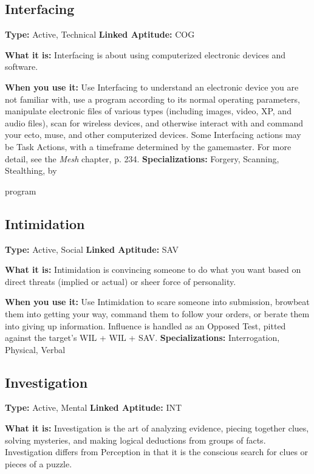 \subsection{Interfacing}

\textbf{Type:} Active, Technical
\textbf{Linked Aptitude:} COG

\textbf{What it is:} Interfacing is about using computerized 
electronic devices and software.

\textbf{When you use it:} Use Interfacing to understand an 
electronic device you are not familiar with, use a program
according to its normal operating parameters,
manipulate electronic files of various types (including 
images, video, XP, and audio files), scan for wireless 
devices, and otherwise interact with and command 
your ecto, muse, and other computerized devices. 
Some Interfacing actions may be Task Actions, with 
a timeframe determined by the gamemaster. For more 
detail, see the \textit{Mesh} chapter, p. 234.
\textbf{Specializations:} Forgery, Scanning, Stealthing, by 

program

\subsection{Intimidation}

\textbf{Type:} Active, Social
\textbf{Linked Aptitude:} SAV

\textbf{What it is:} Intimidation is convincing someone to 
do what you want based on direct threats (implied or 
actual) or sheer force of personality.

\textbf{When you use it:} Use Intimidation to scare someone 
into submission, browbeat them into getting your way, 
command them to follow your orders, or berate them 
into giving up information. Influence is handled as an 
Opposed Test, pitted against the target's WIL + WIL 
+ SAV.
\textbf{Specializations:} Interrogation, Physical, Verbal

\subsection{Investigation}

\textbf{Type:} Active, Mental
\textbf{Linked Aptitude:} INT

\textbf{What it is:} Investigation is the art of analyzing 
evidence, piecing together clues, solving mysteries, 
and making logical deductions from groups of facts. 
Investigation differs from Perception in that it is the 
conscious search for clues or pieces of a puzzle.

